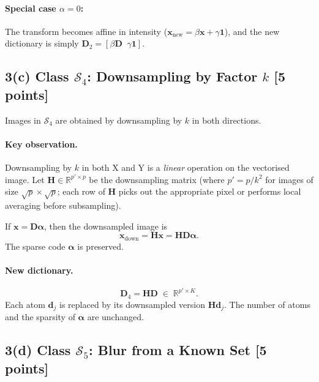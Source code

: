 \documentclass[11pt]{article}
\begin{document}
\paragraph{Special case $\alpha = 0$:} The transform becomes affine in intensity
($\boldsymbol{x}_{\text{new}} = \beta\boldsymbol{x} + \gamma\boldsymbol{1}$), and the new
dictionary is simply $\boldsymbol{D}_2 = [\beta\boldsymbol{D}\;\;\gamma\boldsymbol{1}]$.

\subsection*{3(c) Class $\mathcal{S}_4$: Downsampling by Factor $k$ [5 points]}

Images in $\mathcal{S}_4$ are obtained by downsampling by $k$ in both directions.

\paragraph{Key observation.}
Downsampling by $k$ in both X and Y is a \emph{linear} operation on the vectorised image.
Let $\boldsymbol{H} \in \mathbb{R}^{p' \times p}$ be the downsampling matrix (where
$p' = p/k^2$ for images of size $\sqrt{p}\times\sqrt{p}$; each row of $\boldsymbol{H}$
picks out the appropriate pixel or performs local averaging before subsampling).

If $\boldsymbol{x} = \boldsymbol{D}\boldsymbol{\alpha}$, then the downsampled image is
\[
\boldsymbol{x}_{\text{down}} = \boldsymbol{H}\boldsymbol{x} = \boldsymbol{H}\boldsymbol{D}\boldsymbol{\alpha}.
\]
The sparse code $\boldsymbol{\alpha}$ is preserved.

\paragraph{New dictionary.}
\[
\boxed{\boldsymbol{D}_4 = \boldsymbol{H}\boldsymbol{D} \;\in\;\mathbb{R}^{p' \times K}.}
\]
Each atom $\boldsymbol{d}_j$ is replaced by its downsampled version $\boldsymbol{H}\boldsymbol{d}_j$.
The number of atoms and the sparsity of $\boldsymbol{\alpha}$ are unchanged.

\subsection*{3(d) Class $\mathcal{S}_5$: Blur from a Known Set [5 points]}
\end{document}
